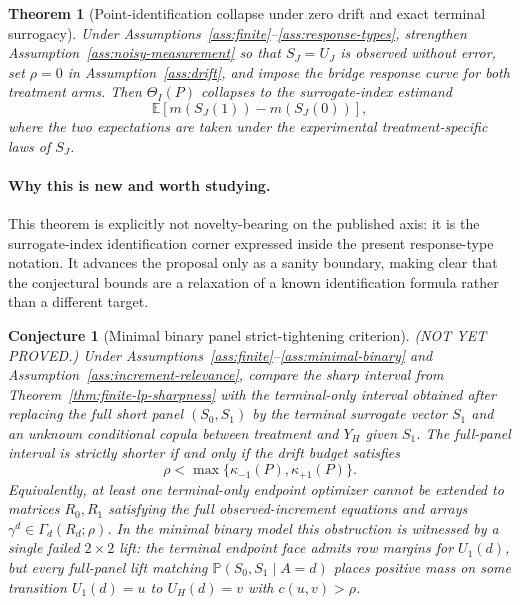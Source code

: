 \documentclass[11pt]{article}
\newcommand{\E}{\mathbb{E}}
\renewcommand{\Pr}{\mathbb{P}}
\theoremstyle{definition}
\theoremstyle{plain}
\newtheorem{theorem}{Theorem}
\newtheorem{conjecture}{Conjecture}
\theoremstyle{remark}
\begin{document}
\begin{theorem}[Point-identification collapse under zero drift and exact terminal surrogacy]\label{thm:point-collapse}
Under Assumptions~\ref{ass:finite}--\ref{ass:response-types}, strengthen Assumption~\ref{ass:noisy-measurement} so that \(S_J=U_J\) is observed without error, set \(\rho=0\) in Assumption~\ref{ass:drift}, and impose the bridge response curve for both treatment arms.  Then \(\Theta_I(P)\) collapses to the surrogate-index estimand
\[
  \E[m(S_J(1))-m(S_J(0))],
\]
where the two expectations are taken under the experimental treatment-specific laws of \(S_J\).
\end{theorem}
\paragraph{Why this is new and worth studying.}
This theorem is explicitly not novelty-bearing on the published axis: it is the \citet{AtheyChettyImbensKang2019} surrogate-index identification corner expressed inside the present response-type notation.  It advances the proposal only as a sanity boundary, making clear that the conjectural bounds are a relaxation of a known identification formula rather than a different target.

\begin{conjecture}[Minimal binary panel strict-tightening criterion]\label{conj:panel-tightening}
(NOT YET PROVED.)  Under Assumptions~\ref{ass:finite}--\ref{ass:minimal-binary} and Assumption~\ref{ass:increment-relevance}, compare the sharp interval from Theorem~\ref{thm:finite-lp-sharpness} with the terminal-only interval obtained after replacing the full short panel \((S_0,S_1)\) by the terminal surrogate vector \(S_1\) and an unknown conditional copula between treatment and \(Y_H\) given \(S_1\).  The full-panel interval is strictly shorter if and only if the drift budget satisfies
\[
  \rho < \max\{\kappa_{-1}(P),\kappa_{+1}(P)\}.
\]
Equivalently, at least one terminal-only endpoint optimizer cannot be extended to matrices \(R_0,R_1\) satisfying the full observed-increment equations and arrays \(\gamma^d\in\Gamma_d(R_d;\rho)\).  In the minimal binary model this obstruction is witnessed by a single failed \(2\times2\) lift: the terminal endpoint face admits row margins for \(U_1(d)\), but every full-panel lift matching \(\Pr(S_0,S_1\mid A=d)\) places positive mass on some transition \(U_1(d)=u\) to \(U_H(d)=v\) with \(c(u,v)>\rho\).
\end{conjecture}
\end{document}
